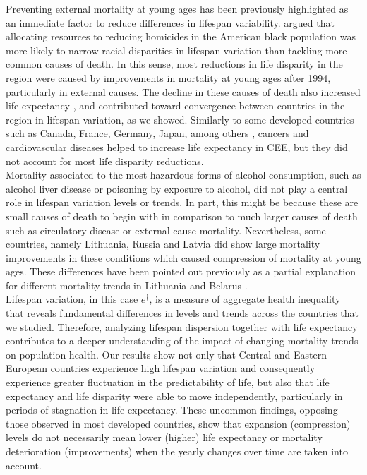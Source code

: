 \documentclass{article}
\begin{document}
\begin{spacing}{1.5}
Preventing external mortality at young ages has been previously highlighted as an immediate factor to reduce differences in lifespan variability. \citet{firebaugh2014lifespans} argued that allocating resources to reducing homicides in the American black population was more likely to narrow racial disparities in lifespan variation than tackling more common causes of death. In this sense, most reductions in life disparity in the region were caused by improvements in mortality at young ages after 1994, particularly in external causes. The decline in these causes of death also increased life expectancy \citep{trias2017contribution}, and contributed toward convergence between countries in the region in lifespan variation, as we showed. Similarly to some developed countries such as Canada, France, Germany, Japan, among others \citep{seligman2016equity}, cancers and cardiovascular diseases helped to increase life expectancy in CEE, but they did not account for most life disparity reductions.\\

Mortality associated to the most hazardous forms of alcohol consumption, such as alcohol liver disease or poisoning by exposure to alcohol, did not play a central role in lifespan variation levels or trends. In part, this might be because these are small causes of death to begin with in comparison to much larger causes of death such as circulatory disease or external cause mortality. Nevertheless, some countries, namely Lithuania, Russia and Latvia did show large mortality improvements in these conditions which caused compression of mortality at young ages. These differences have been pointed out previously as a partial explanation for different mortality trends in Lithuania and Belarus \citep{grigoriev2015spatial}.\\

Lifespan variation, in this case $e^\dagger$, is a measure of aggregate health inequality that reveals fundamental differences in levels and trends across the countries that we studied. Therefore, analyzing lifespan dispersion together with life expectancy contributes to a deeper understanding of the impact of changing mortality trends on population health. Our results show not only that Central and Eastern European countries experience high lifespan variation and consequently experience greater fluctuation in the predictability of life, but also that life expectancy and life disparity were able to move independently, particularly in periods of stagnation in life expectancy. These uncommon findings, opposing those observed in most developed countries, show that expansion (compression) levels do not necessarily mean lower (higher) life expectancy  or mortality deterioration (improvements) when the yearly changes over time are taken into account. \\


\end{spacing}
\end{document}

